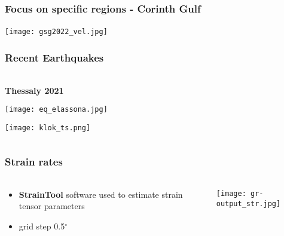 \begin{frame}
  \frametitle{Focus on specific regions - Corinth Gulf}
  \framesubtitle{}
  \label{}
  
  \begin{center}
    \texttt{[image: gsg2022\_vel.jpg]}  
  \end{center}

\end{frame}
\note{}

\begin{frame}
  \frametitle{Recent Earthquakes}
  \framesubtitle{}
  \label{}
  \vskip-1cm
  \begin{columns}[T]
    \begin{column}{.5\textwidth}
    \begin{center}
 	  \textbf{Thessaly 2021} 
 	  
 	  \texttt{[image: eq\_elassona.jpg]}    

      \texttt{[image: klok\_ts.png]}

    \end{center}

    \end{column}
    \textcolor{blue!40}{\vrule width 1pt}
  \end{columns}
\end{frame}
\note{}

\begin{frame}
  \frametitle{Strain rates}
  \framesubtitle{}
  \label{}
  \vskip-1cm
\begin{columns}[T]
  \begin{column}{.3\textwidth}
    \begin{itemize}\setlength\itemsep{1em}
      \item \textbf{StrainTool} software used to estimate strain tensor parameters \citep{straintool}
      \item grid step 0.5$^{\circ}$
    \end{itemize}
  \end{column}
  \begin{column}{.7\textwidth}
      \texttt{[image: gr-output\_str.jpg]}
  \end{column}
\end{columns}
\end{frame}
\note{}

